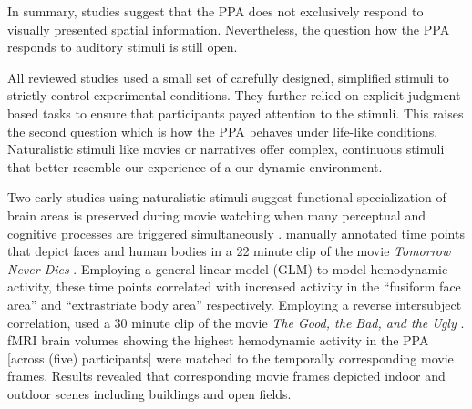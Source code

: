 \documentclass[english]{article}
\begin{document}

In summary, studies suggest that the PPA does not exclusively respond to
visually presented spatial information. Nevertheless, the question how the
PPA responds to auditory stimuli is still open.


All reviewed studies used a small set of carefully designed, simplified stimuli
to strictly control experimental conditions.
They further relied on explicit judgment-based tasks to ensure that participants
payed attention to the stimuli.
This raises the second question which is how the PPA behaves under life-like
conditions.
Naturalistic stimuli like movies \citep{hasson2008neurocinematics,
sonkusare2019naturalistic} or narratives \citep{honey2012not,
lerner2011topographic, silbert2014coupled} offer complex, continuous stimuli
that better resemble our experience of a our dynamic environment.

Two early studies using naturalistic stimuli suggest functional specialization
of brain areas is preserved during movie watching when many perceptual and
cognitive processes are triggered simultaneously \citep{bartels2004mapping, hasson2004intersubject}.
\citep{bartels2004mapping} manually annotated time points that depict faces and
human bodies in a 22 minute clip of the movie \textit{Tomorrow Never Dies}
\citep{tomorrowneverdies}.
Employing a general linear model (GLM) to model hemodynamic activity, these time
points correlated with increased activity in the ``fusiform face area''
\citep{kanwisher1997ffa} and ``extrastriate body area''
\citep{downing2001bodyarea} respectively.
Employing a reverse intersubject correlation, \citep{hasson2004intersubject}
used a 30 minute clip of the movie \textit{The Good, the Bad, and the Ugly}
\citep{goodbadugly}.
fMRI brain volumes showing the highest hemodynamic activity
in the PPA [across (five) participants] were matched to the temporally
corresponding movie frames.
Results revealed that corresponding movie frames
depicted indoor and outdoor scenes including buildings and open fields.
\end{document}
